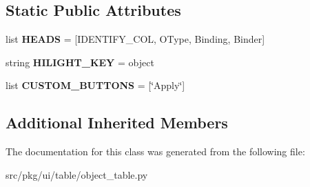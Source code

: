 \subsection*{Static Public Attributes}
\begin{DoxyCompactItemize}
\item 
\mbox{\label{classrnb-planning_1_1src_1_1pkg_1_1ui_1_1table_1_1object__table_1_1_object_table_a1d3fad3c12ecc105b708805c2a6e2e1c}} 
list {\bfseries H\+E\+A\+DS} = \mbox{[}I\+D\+E\+N\+T\+I\+F\+Y\+\_\+\+C\+OL, \textquotesingle{}O\+Type\textquotesingle{}, \textquotesingle{}Binding\textquotesingle{}, \textquotesingle{}Binder\textquotesingle{}\mbox{]}
\item 
\mbox{\label{classrnb-planning_1_1src_1_1pkg_1_1ui_1_1table_1_1object__table_1_1_object_table_a12499e47cfd2a84fb08a136e153548a9}} 
string {\bfseries H\+I\+L\+I\+G\+H\+T\+\_\+\+K\+EY} = \textquotesingle{}object\textquotesingle{}
\item 
\mbox{\label{classrnb-planning_1_1src_1_1pkg_1_1ui_1_1table_1_1object__table_1_1_object_table_a6aaa5b312d33c3107bab0bc08ccd98c0}} 
list {\bfseries C\+U\+S\+T\+O\+M\+\_\+\+B\+U\+T\+T\+O\+NS} = \mbox{[}\char`\"{}Apply\char`\"{}\mbox{]}
\end{DoxyCompactItemize}
\subsection*{Additional Inherited Members}


The documentation for this class was generated from the following file\+:\begin{DoxyCompactItemize}
\item 
src/pkg/ui/table/object\+\_\+table.\+py\end{DoxyCompactItemize}
